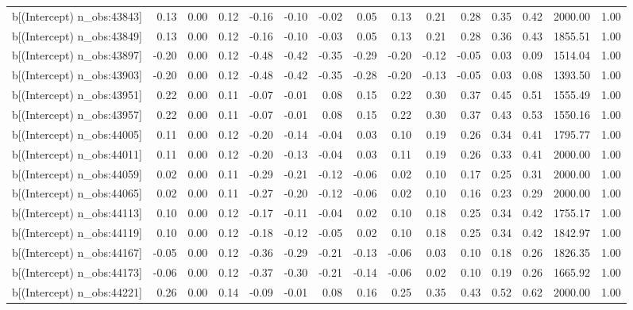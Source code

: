 \begin{table}[ht]
\begin{tabular}{rrrrrrrrrrrrrrr}
  b[(Intercept) n\_obs:43843] & 0.13 & 0.00 & 0.12 & -0.16 & -0.10 & -0.02 & 0.05 & 0.13 & 0.21 & 0.28 & 0.35 & 0.42 & 2000.00 & 1.00 \\ 
  b[(Intercept) n\_obs:43849] & 0.13 & 0.00 & 0.12 & -0.16 & -0.10 & -0.03 & 0.05 & 0.13 & 0.21 & 0.28 & 0.36 & 0.43 & 1855.51 & 1.00 \\ 
  b[(Intercept) n\_obs:43897] & -0.20 & 0.00 & 0.12 & -0.48 & -0.42 & -0.35 & -0.29 & -0.20 & -0.12 & -0.05 & 0.03 & 0.09 & 1514.04 & 1.00 \\ 
  b[(Intercept) n\_obs:43903] & -0.20 & 0.00 & 0.12 & -0.48 & -0.42 & -0.35 & -0.28 & -0.20 & -0.13 & -0.05 & 0.03 & 0.08 & 1393.50 & 1.00 \\ 
  b[(Intercept) n\_obs:43951] & 0.22 & 0.00 & 0.11 & -0.07 & -0.01 & 0.08 & 0.15 & 0.22 & 0.30 & 0.37 & 0.45 & 0.51 & 1555.49 & 1.00 \\ 
  b[(Intercept) n\_obs:43957] & 0.22 & 0.00 & 0.11 & -0.07 & -0.01 & 0.08 & 0.15 & 0.22 & 0.30 & 0.37 & 0.43 & 0.53 & 1550.16 & 1.00 \\ 
  b[(Intercept) n\_obs:44005] & 0.11 & 0.00 & 0.12 & -0.20 & -0.14 & -0.04 & 0.03 & 0.10 & 0.19 & 0.26 & 0.34 & 0.41 & 1795.77 & 1.00 \\ 
  b[(Intercept) n\_obs:44011] & 0.11 & 0.00 & 0.12 & -0.20 & -0.13 & -0.04 & 0.03 & 0.11 & 0.19 & 0.26 & 0.33 & 0.41 & 2000.00 & 1.00 \\ 
  b[(Intercept) n\_obs:44059] & 0.02 & 0.00 & 0.11 & -0.29 & -0.21 & -0.12 & -0.06 & 0.02 & 0.10 & 0.17 & 0.25 & 0.31 & 2000.00 & 1.00 \\ 
  b[(Intercept) n\_obs:44065] & 0.02 & 0.00 & 0.11 & -0.27 & -0.20 & -0.12 & -0.06 & 0.02 & 0.10 & 0.16 & 0.23 & 0.29 & 2000.00 & 1.00 \\ 
  b[(Intercept) n\_obs:44113] & 0.10 & 0.00 & 0.12 & -0.17 & -0.11 & -0.04 & 0.02 & 0.10 & 0.18 & 0.25 & 0.34 & 0.42 & 1755.17 & 1.00 \\ 
  b[(Intercept) n\_obs:44119] & 0.10 & 0.00 & 0.12 & -0.18 & -0.12 & -0.05 & 0.02 & 0.10 & 0.18 & 0.25 & 0.34 & 0.42 & 1842.97 & 1.00 \\ 
  b[(Intercept) n\_obs:44167] & -0.05 & 0.00 & 0.12 & -0.36 & -0.29 & -0.21 & -0.13 & -0.06 & 0.03 & 0.10 & 0.18 & 0.26 & 1826.35 & 1.00 \\ 
  b[(Intercept) n\_obs:44173] & -0.06 & 0.00 & 0.12 & -0.37 & -0.30 & -0.21 & -0.14 & -0.06 & 0.02 & 0.10 & 0.19 & 0.26 & 1665.92 & 1.00 \\ 
  b[(Intercept) n\_obs:44221] & 0.26 & 0.00 & 0.14 & -0.09 & -0.01 & 0.08 & 0.16 & 0.25 & 0.35 & 0.43 & 0.52 & 0.62 & 2000.00 & 1.00 \\ 

\end{tabular}
\end{table}

